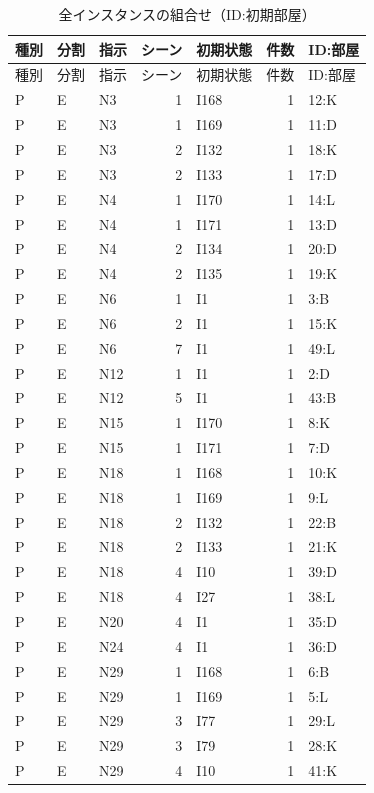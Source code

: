 {\scriptsize\setlength{\tabcolsep}{3pt}
\begin{longtable}{lllrlrp{.35\linewidth}}
\caption{全インスタンスの組合せ（ID:初期部屋）}\label{tab:joint_coverage}\\
\hline
種別 & 分割 & 指示 & シーン & 初期状態 & 件数 & ID:部屋\\\hline\endfirsthead
種別 & 分割 & 指示 & シーン & 初期状態 & 件数 & ID:部屋\\\hline\endhead
\hline\endfoot
P & E & N3 & 1 & I168 & 1 & 12:K \\
P & E & N3 & 1 & I169 & 1 & 11:D \\
P & E & N3 & 2 & I132 & 1 & 18:K \\
P & E & N3 & 2 & I133 & 1 & 17:D \\
P & E & N4 & 1 & I170 & 1 & 14:L \\
P & E & N4 & 1 & I171 & 1 & 13:D \\
P & E & N4 & 2 & I134 & 1 & 20:D \\
P & E & N4 & 2 & I135 & 1 & 19:K \\
P & E & N6 & 1 & I1 & 1 & 3:B \\
P & E & N6 & 2 & I1 & 1 & 15:K \\
P & E & N6 & 7 & I1 & 1 & 49:L \\
P & E & N12 & 1 & I1 & 1 & 2:D \\
P & E & N12 & 5 & I1 & 1 & 43:B \\
P & E & N15 & 1 & I170 & 1 & 8:K \\
P & E & N15 & 1 & I171 & 1 & 7:D \\
P & E & N18 & 1 & I168 & 1 & 10:K \\
P & E & N18 & 1 & I169 & 1 & 9:L \\
P & E & N18 & 2 & I132 & 1 & 22:B \\
P & E & N18 & 2 & I133 & 1 & 21:K \\
P & E & N18 & 4 & I10 & 1 & 39:D \\
P & E & N18 & 4 & I27 & 1 & 38:L \\
P & E & N20 & 4 & I1 & 1 & 35:D \\
P & E & N24 & 4 & I1 & 1 & 36:D \\
P & E & N29 & 1 & I168 & 1 & 6:B \\
P & E & N29 & 1 & I169 & 1 & 5:L \\
P & E & N29 & 3 & I77 & 1 & 29:L \\
P & E & N29 & 3 & I79 & 1 & 28:K \\
P & E & N29 & 4 & I10 & 1 & 41:K \\

\end{longtable}}
